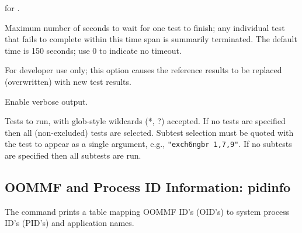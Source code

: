 \begin{description}
 for .
\item[\optkey{-timeout seconds}]
 Maximum number of seconds to wait for one test to finish; any
 individual test that fails to complete within this time span is summarily
 terminated.  The default time is 150 seconds; use 0 to indicate no timeout.
\item[\optkey{-updaterefdata}]
 For developer use only; this option causes the reference results to
 be replaced (overwritten) with new test results.
\item[\optkey{-v}]
 Enable verbose output.
\item[\optkey{testa testb \ldots}]
 Tests to run, with glob-style wildcards (*, ?) accepted.  If no tests
 are specified then all (non-excluded) tests are selected.  Subtest
 selection must be quoted with the test to appear as a single
 argument, e.g., \verb+"exch6ngbr 1,7,9"+.  If no subtests are
 specified then all subtests are run.
\end{description}


\subsection{OOMMF and Process ID Information: pidinfo\label{sec:pidinfo}}%

The  command prints a table mapping OOMMF ID's (OID's)
to system process ID's (PID's) and application names.

